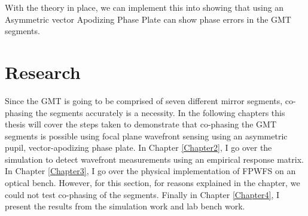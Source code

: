 With the theory in place, we can implement this into showing that using an Asymmetric vector Apodizing Phase Plate can show phase errors in the GMT segments.

\section{Research}

Since the GMT is going to be comprised of seven different mirror segments, co-phasing the segments accurately is a necessity.  In the following chapters this thesis will cover the steps taken to demonstrate that co-phasing the GMT segments is possible using focal plane wavefront sensing using an asymmetric pupil, vector-apodizing phase plate.  In Chapter \ref{Chapter2}, I go over the simulation to detect wavefront measurements using an empirical response matrix.  In Chapter \ref{Chapter3}, I go over the physical implementation of FPWFS on an optical bench.  However, for this section, for reasons explained in the chapter, we could not test co-phasing of the segments.  Finally in Chapter \ref{Chapter4}, I present the results from the simulation work and lab bench work.

